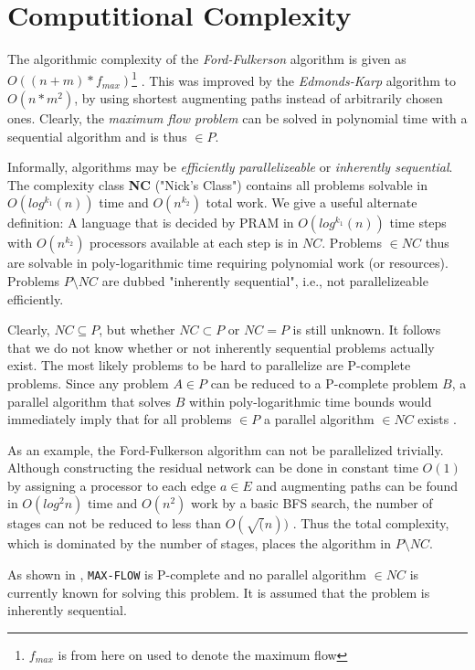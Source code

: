 \documentclass[a4paper,10pt, twocolumn]{article}
\begin{document}
\section{Computitional Complexity}
\label{sec:cc}
The algorithmic complexity of the \emph{Ford-Fulkerson} algorithm is given as $O((n+m)*f_{max})$\footnote{$f_{max}$ is from here on used to denote the maximum flow} \cite{ahuja93,papa95}. This was improved by the \emph{Edmonds-Karp} algorithm to $O(n*m^2)$, by using shortest augmenting paths instead of arbitrarily chosen ones. Clearly, the \emph{maximum flow problem} can be solved in polynomial time with a sequential algorithm and is thus $\in P$.

Informally, algorithms may be \emph{efficiently parallelizeable} or \emph{inherently sequential}. The complexity class \textbf{NC} \cite{papa95} ("Nick's Class") contains all problems solvable in $O(log^{k_1}(n))$ time and $O(n^{k_2})$ total work. We give a useful alternate definition:  A language that is decided by PRAM in $O(log^{k_1}(n))$ time steps with $O(n^{k_2})$ processors available at each step is in $NC$. Problems $\in NC$ thus are solvable  in poly-logarithmic time requiring polynomial work (or resources). Problems $P \setminus NC$ are dubbed "inherently sequential", i.e., not parallelizeable efficiently. 

Clearly, $NC \subseteq P$, but whether $NC \subset P$ or $NC = P$ is still unknown. It follows that we do not know whether or not inherently sequential problems actually exist. The most likely problems to be hard to parallelize are P-complete problems. Since any problem $A \in P$ can be reduced to a P-complete problem $B$, a parallel algorithm that solves $B$ within poly-logarithmic time bounds would immediately imply that for all problems $\in P$ a parallel algorithm $\in NC$ exists \cite{papa95}.

As an example, the Ford-Fulkerson algorithm can not be parallelized trivially. Although constructing the residual network can be done in constant time $O(1)$ by assigning a processor to each edge $a \in E$ and augmenting paths can be found in $O(log^{2}n)$ time and $O(n^{2})$ work by a basic BFS search, the number of stages can not be reduced to less than $O(\sqrt(n))$ \cite{ahuja93}. Thus the total complexity, which is dominated by the number of stages, places the algorithm in $P \setminus NC$.
	
As shown in \cite{papa95}, \lstinline|MAX-FLOW| is P-complete and no parallel algorithm $\in NC$ is currently known for solving this problem. It is assumed that the problem is inherently sequential.
\end{document}
